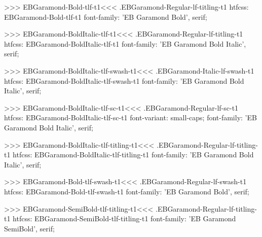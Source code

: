 {{{{{{{>>>
\<EBGaramond-Bold-tlf-t1\><<<
.EBGaramond-Regular-lf-titling-t1
htfcss:  EBGaramond-Bold-tlf-t1  font-family: 'EB Garamond Bold', serif;

>>>
\<EBGaramond-BoldItalic-tlf-t1\><<<
.EBGaramond-Regular-lf-titling-t1
htfcss:  EBGaramond-BoldItalic-tlf-t1  font-family: 'EB Garamond Bold Italic', serif;

>>>
\<EBGaramond-BoldItalic-tlf-swash-t1\><<<
.EBGaramond-Italic-lf-swash-t1
htfcss:  EBGaramond-BoldItalic-tlf-swash-t1  font-family: 'EB Garamond Bold Italic', serif;

>>>
\<EBGaramond-BoldItalic-tlf-sc-t1\><<<
.EBGaramond-Regular-lf-sc-t1
htfcss:  EBGaramond-BoldItalic-tlf-sc-t1  font-variant: small-caps; font-family: 'EB Garamond Bold Italic', serif;

>>>
\<EBGaramond-BoldItalic-tlf-titling-t1\><<<
.EBGaramond-Regular-lf-titling-t1
htfcss:  EBGaramond-BoldItalic-tlf-titling-t1  font-family: 'EB Garamond Bold Italic', serif;

>>>
\<EBGaramond-Bold-tlf-swash-t1\><<<
.EBGaramond-Regular-lf-swash-t1
htfcss:  EBGaramond-Bold-tlf-swash-t1  font-family: 'EB Garamond Bold', serif;

>>>
\<EBGaramond-SemiBold-tlf-titling-t1\><<<
.EBGaramond-Regular-lf-titling-t1
htfcss:  EBGaramond-SemiBold-tlf-titling-t1  font-family: 'EB Garamond SemiBold', serif;

}}}}}}}
